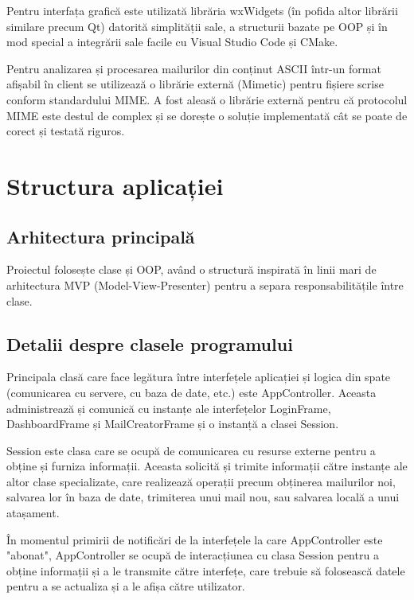 \documentclass[runningheads]{llncs}
\begin{document}
Pentru interfața grafică este utilizată librăria wxWidgets (în pofida altor librării similare precum Qt) datorită simplității sale, a structurii bazate pe OOP și în mod special a integrării sale facile cu Visual Studio Code și CMake.

Pentru analizarea și procesarea mailurilor din conținut ASCII într-un format afișabil în client se utilizează o librărie externă (Mimetic) pentru fișiere scrise conform standardului MIME\cite{ref_rfc_mime}. A fost aleasă o librărie externă pentru că protocolul MIME este destul de complex și se dorește o soluție implementată cât se poate de corect și testată riguros.



\section{Structura aplicației}


\subsection{Arhitectura principală}

Proiectul folosește clase și OOP, având o structură inspirată în linii mari de arhitectura MVP (Model-View-Presenter) pentru a separa responsabilitățile între clase.



\subsection{Detalii despre clasele programului}


Principala clasă care face legătura între interfețele aplicației și logica din spate (comunicarea cu servere, cu baza de date, etc.) este AppController. Aceasta administrează și comunică cu instanțe ale interfețelor LoginFrame, DashboardFrame și MailCreatorFrame și o instanță a clasei Session.

Session este clasa care se ocupă de comunicarea cu resurse externe pentru a obține și furniza informații. Aceasta solicită și trimite informații către instanțe ale altor clase specializate, care realizează operații precum obținerea mailurilor noi, salvarea lor în baza de date, trimiterea unui mail nou, sau salvarea locală a unui atașament.

În momentul primirii de notificări de la interfețele la care AppController este "abonat", AppController se ocupă de interacțiunea cu clasa Session pentru a obține informații și a le transmite către interfețe, care trebuie să folosească datele pentru a se actualiza și a le afișa către utilizator.
\end{document}

